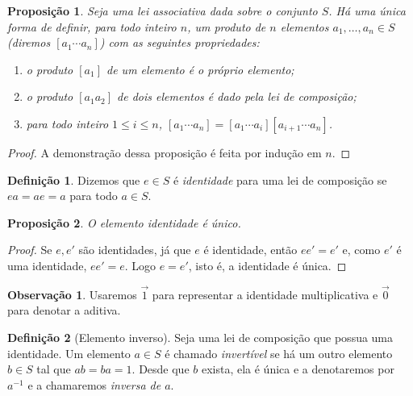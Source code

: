 \documentclass[a4paper,12pt]{report}
\theoremstyle{plain}
\newtheorem{proposicao}{Proposição}[section]
\theoremstyle{definition}
\newtheorem{definicao}{Definição}[section]
\newtheorem{observacao}{Observação}[section]
\begin{document}
	\begin{proposicao}
		Seja uma lei associativa dada sobre o conjunto
		\(S\). Há uma única forma de definir, para todo inteiro \(n\), um
		produto de \(n\) elementos \(a_1,\dots,a_n \in S\) (diremos
		\([a_1\dotsb a_n]\)) com as seguintes propriedades:
		
		\begin{enumerate}
			\def\labelenumi{\arabic{enumi}.}
			\item
			o produto \([a_1]\) de um elemento é o próprio elemento;
			\item
			o produto \([a_1a_2]\) de dois elementos é dado pela lei de
			composição;
			\item
			para todo inteiro \(1\leq i\leq n\),
			\([a_1\dotsb a_n] = [a_1\dotsb a_i][a_{i+1}\dotsb a_n]\).
		\end{enumerate}
	\end{proposicao}
	
	\begin{proof}
		A demonstração dessa proposição é feita por indução em \(n\).
	\end{proof}
	
	\begin{definicao}
		Dizemos que \(e\in S\) é \emph{identidade} para uma lei de composição se \(ea = ae = a\) para todo \(a\in S\).
	\end{definicao}
	
	\begin{proposicao}
		O elemento identidade é único.
	\end{proposicao}
	\begin{proof}
		Se \(e,e'\) são identidades, já que \(e\) é identidade, então \(ee' = e'\) e, como $e'$ é uma identidade, \(ee' = e\). Logo \(e = e'\), isto é, a identidade é única.
	\end{proof}
	
	\begin{observacao}
		Usaremos $\vec{1}$ para representar a identidade multiplicativa e $\vec{0}$ para denotar a aditiva.
	\end{observacao}
	
	\begin{definicao}[Elemento inverso]
		Seja uma lei de composição que possua uma identidade. Um elemento \(a\in S\) é chamado \emph{invertível} se há um outro elemento \(b\in S\) tal que \(ab = ba = 1\). Desde que \(b\) exista, ela é única e a denotaremos por \(a^{-1}\) e a chamaremos
		\emph{inversa de $a$}.
	\end{definicao}
	
\end{document}
